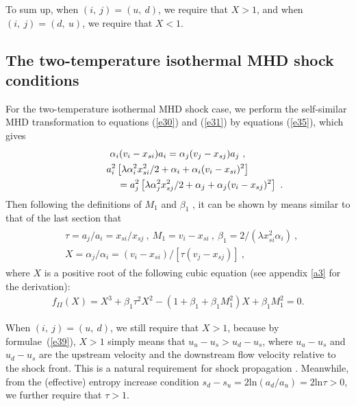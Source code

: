 \documentclass[fleqn,usenatbib]{mnras}
\begin{document}
To sum up, when $(i,\ j)=(u,\ d)$, we require that $X>1$, and when $(i,\ j)=(d,\ u)$, we require that $X<1$.

\subsection{The two-temperature isothermal MHD shock conditions}
\label{s3.2}
For the two-temperature isothermal MHD shock case, we perform the self-similar MHD transformation to equations (\ref{e30}) and (\ref{e31}) by equations (\ref{e35}), which gives
\begin{gather}
\alpha_{i}(v_{i}-x_{si})a_{i}=\alpha_{j}(v_{j}-x_{sj})a_{j}\ ,\\
a^{2}_{i}\left[ \lambda \alpha_{i}^{2} x_{si}^{2}/2+\alpha_{i}+\alpha_{i}(v_{i}-x_{si})^{2}\right]\notag\\
 \qquad\qquad \quad =a^{2}_{j}\left[ \lambda \alpha_{j}^{2}
 x_{sj}^{2}/2+\alpha_{j}+\alpha_{j}(v_{i}-x_{sj})^{2}\right]\ .
 \label{e38}
\end{gather}
Then following the definitions of $M_{1}$ and $\beta_{1}$ , it can be shown by means similar to that of the last section that
\begin{gather}
\begin{split}
&\tau=a_{j}/a_{i}=x_{si}/x_{sj}\ ,
\ M_{1}=v_{i}-x_{si}\ ,
\ \beta_{1}=2/(\lambda x^{2}_{si}\alpha_{i})\ ,\\
&X=\alpha_{j}/\alpha_{i}=(v_{i}-x_{si})/[\tau (v_{j}-x_{sj})]\ ,
\end{split}\label{e39}
\end{gather}
where $X$ is a positive root of the following cubic equation (see appendix \ref{a3} for the derivation):
\begin{gather}
f_{II}(X)=X^{3}+\beta_{1}\tau^{2} X^{2}
 -(1+\beta_{1}
 +\beta_{1} M_{1}^{2}) X+\beta_{1}M_{1}^{2}=0. \label{e40}
\end{gather}

When $(i,\ j)=(u,\ d)$, we still require that $X>1$, because by formulae~(\ref{e39}), $X>1$ simply means that $u_{u}-u_{s}>u_{d}-u_{s}$, where $u_{u}-u_{s}$ and $u_{d}-u_{s}$ are the upstream velocity and the downstream flow velocity relative to the shock front. This is a natural requirement for shock propagation \citep{FM}. Meanwhile, from the (effective) entropy increase condition $s_{d}-s_{u}=2\mathrm{ln}(a_{d}/a_{u})=2\mathrm{ln}\tau>0$, we further require that $\tau>1$. 
\end{document}
